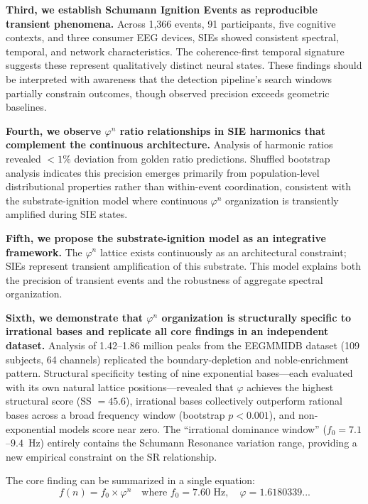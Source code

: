 \documentclass[11pt,a4paper]{article}
\newcommand{\phisym}{\varphi}
\begin{document}
\textbf{Third, we establish Schumann Ignition Events as reproducible transient phenomena.} Across 1,366 events, 91 participants, five cognitive contexts, and three consumer EEG devices, SIEs showed consistent spectral, temporal, and network characteristics. The coherence-first temporal signature suggests these represent qualitatively distinct neural states. These findings should be interpreted with awareness that the detection pipeline's search windows partially constrain outcomes, though observed precision exceeds geometric baselines.

\textbf{Fourth, we observe $\phisym^n$ ratio relationships in SIE harmonics that complement the continuous architecture.} Analysis of harmonic ratios revealed $<1\%$ deviation from golden ratio predictions. Shuffled bootstrap analysis indicates this precision emerges primarily from population-level distributional properties rather than within-event coordination, consistent with the substrate-ignition model where continuous $\phisym^n$ organization is transiently amplified during SIE states.

\textbf{Fifth, we propose the substrate-ignition model as an integrative framework.} The $\phisym^n$ lattice exists continuously as an architectural constraint; SIEs represent transient amplification of this substrate. This model explains both the precision of transient events and the robustness of aggregate spectral organization.

\textbf{Sixth, we demonstrate that $\phisym^n$ organization is structurally specific to irrational bases and replicate all core findings in an independent dataset.} Analysis of 1.42--1.86 million peaks from the EEGMMIDB dataset (109 subjects, 64 channels) replicated the boundary-depletion and noble-enrichment pattern. Structural specificity testing of nine exponential bases---each evaluated with its own natural lattice positions---revealed that $\phisym$ achieves the highest structural score (SS $= 45.6$), irrational bases collectively outperform rational bases across a broad frequency window (bootstrap $p < 0.001$), and non-exponential models score near zero. The ``irrational dominance window'' ($f_0 = 7.1$--$9.4$~Hz) entirely contains the Schumann Resonance variation range, providing a new empirical constraint on the SR relationship.

The core finding can be summarized in a single equation:
\begin{equation}
f(n) = f_0 \times \phisym^n \quad \text{where } f_0 = 7.60 \text{ Hz}, \quad \phisym = 1.6180339...
\end{equation}
\end{document}
